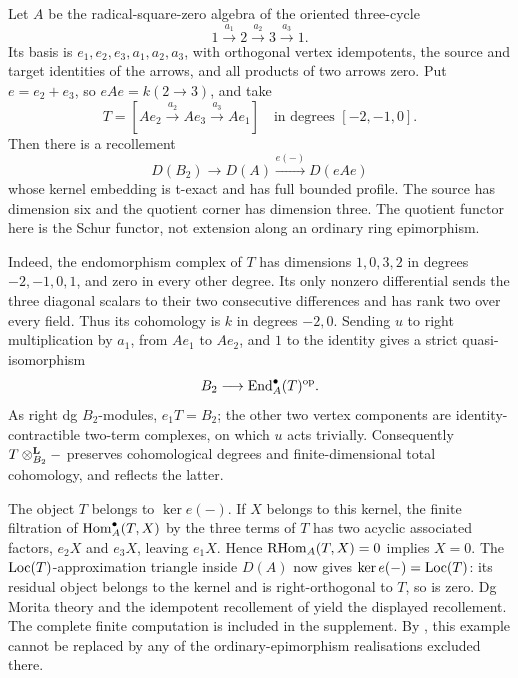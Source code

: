 \begin{example}\label{ex:sphere-schur}
Let \(A\) be the radical-square-zero algebra of the oriented three-cycle
\[
 1\xrightarrow{a_1}2\xrightarrow{a_2}3\xrightarrow{a_3}1.
\]
Its basis is \(e_1,e_2,e_3,a_1,a_2,a_3\), with orthogonal vertex idempotents, the source and target identities of the arrows, and all products of two arrows zero.  Put \(e=e_2+e_3\), so \(eAe=k(2\to3)\), and take
\[
 T=[Ae_2\xrightarrow{a_2}Ae_3\xrightarrow{a_3}Ae_1]
 \quad\text{in degrees }[-2,-1,0].
\]
Then there is a recollement
\[
 D(B_2)\longrightarrow D(A)\xrightarrow{e(-)}D(eAe)
\]
whose kernel embedding is t-exact and has full bounded profile.  The source has dimension six and the quotient corner has dimension three.  The quotient functor here is the Schur functor, not extension along an ordinary ring epimorphism.

Indeed, the endomorphism complex of \(T\) has dimensions \(1,0,3,2\) in degrees \(-2,-1,0,1\), and zero in every other degree.  Its only nonzero differential sends the three diagonal scalars to their two consecutive differences and has rank two over every field.  Thus its cohomology is \(k\) in degrees \(-2,0\).  Sending \(u\) to right multiplication by \(a_1\), from \(Ae_1\) to \(Ae_2\), and \(1\) to the identity gives a strict quasi-isomorphism
\[
 B_2\longrightarrow\operatorname{End}_A^\bullet(T)^{\mathrm{op}}.
\]
As right dg \(B_2\)-modules, \(e_1T=B_2\); the other two vertex components are identity-contractible two-term complexes, on which \(u\) acts trivially.  Consequently \(T\otimes^{\mathbf L}_{B_2}-\) preserves cohomological degrees and finite-dimensional total cohomology, and reflects the latter.

The object \(T\) belongs to \(\ker e(-)\).  If \(X\) belongs to this kernel, the finite filtration of \(\operatorname{Hom}_A^\bullet(T,X)\) by the three terms of \(T\) has two acyclic associated factors, \(e_2X\) and \(e_3X\), leaving \(e_1X\).  Hence \(\operatorname{RHom}_A(T,X)=0\) implies \(X=0\).  The \(\operatorname{Loc}(T)\)-approximation triangle inside \(D(A)\) now gives \(\ker e(-)=\operatorname{Loc}(T)\): its residual object belongs to the kernel and is right-orthogonal to \(T\), so is zero.  Dg Morita theory and the idempotent recollement of \cite[Proposition~6.1]{KalckYangII} yield the displayed recollement.  The complete finite computation is included in the supplement.  By , this example cannot be replaced by any of the ordinary-epimorphism realisations excluded there.
\end{example}

